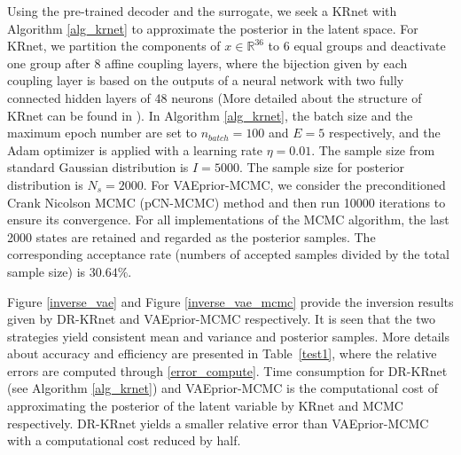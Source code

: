Using the pre-trained decoder and the surrogate, we seek a KRnet with Algorithm \ref{alg_krnet} to approximate the posterior in the latent space.  For KRnet, we partition the components of $x\in\mathbb{R}^{36}$ to 6 equal groups and deactivate one group after 8 affine coupling layers, where the bijection given by each coupling layer is based on the outputs of a neural network with two fully connected hidden layers of 48 neurons (More detailed about the structure of KRnet can be found in \cite{tang2020deep,adda_2022}). In Algorithm \ref{alg_krnet}, the batch size and 
the maximum epoch number
are set to $n_{batch}=100$ and  $E=5$ respectively, and the Adam optimizer is applied
 with a learning rate $\eta=0.01$. 
The sample size from standard Gaussian distribution is $I=5000$. The sample size for posterior distribution is $N_s=2000$. 
For VAEprior-MCMC, we consider the preconditioned Crank Nicolson MCMC (pCN-MCMC) method \cite{beskos2008mcmc,cotter2013mcmc} 
and then run 10000 iterations to ensure its convergence. 
For all implementations of the MCMC algorithm, the last 2000 states are retained and regarded as the posterior samples.  The corresponding acceptance rate (numbers of accepted samples
divided by the total sample size) is $30.64\%$. 

Figure \ref{inverse_vae} and Figure \ref{inverse_vae_mcmc} provide the inversion results given by DR-KRnet and VAEprior-MCMC respectively. It is seen that the two strategies yield consistent mean and variance and posterior samples. %
More details about accuracy and efficiency are presented in Table~\ref{test1}, where the relative errors are computed through \eqref{error_compute}. Time consumption for DR-KRnet (see Algorithm \ref{alg_krnet}) and VAEprior-MCMC is the computational cost of approximating the posterior of the latent variable by KRnet and MCMC respectively.
DR-KRnet yields a smaller relative error than VAEprior-MCMC with a computational cost reduced by half.

